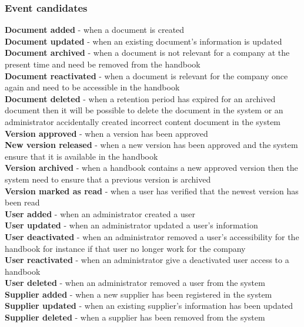 \subsubsection{Event candidates}
\textbf{Document added} - when a document is created\\
\textbf{Document updated} - when an existing document's information is updated\\
\textbf{Document archived} - when a document is not relevant for a company at the present time and need be removed from the handbook\\
\textbf{Document reactivated} - when a document is relevant for the company once again and need to be accessible in the handbook\\
\textbf{Document deleted} - when a retention period has expired for an archived document then it will be possible to delete the document in the system or an administrator accidentally created incorrect content document in the system\\
\textbf{Version approved}  - when a version has been approved\\ 
\textbf{New version released} - when a new version has been approved and the system ensure that it is available in the handbook\\
\textbf{Version archived} - when a handbook contains a new approved version then the system need to ensure that a previous version is archived\\
\textbf{Version marked as read} - when a user has verified that the newest version has been read\\
\textbf{User added} - when an administrator created a user\\
\textbf{User updated} - when an administrator updated a user's information\\
\textbf{User deactivated} - when an administrator removed a user's accessibility for the handbook for instance if that user no longer work for the company\\
\textbf{User reactivated} - when an administrator give a deactivated user access to a handbook\\
\textbf{User deleted} - when an administrator removed a user from the system\\
\textbf{Supplier added} - when a new supplier has been registered in the system\\
\textbf{Supplier updated} - when an existing supplier's information has been updated\\
\textbf{Supplier deleted} - when a supplier has been removed from the system\\
